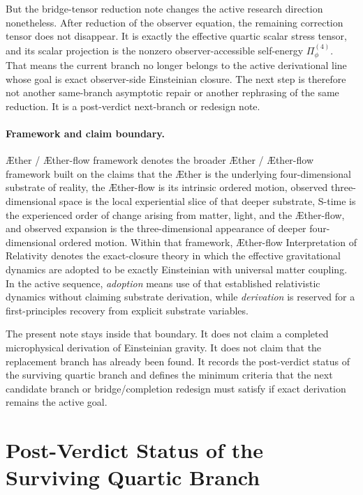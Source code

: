 \documentclass[11pt]{article}
\newcommand{\Aether}{\AE{}ther}
\newcommand{\Aflow}{\AE{}ther-flow}
\newcommand{\TheoryName}{\Aflow{} Interpretation of Relativity}
\newcommand{\TheoryProgram}{\Aether{} / \Aflow{} framework}
\begin{document}
But the bridge-tensor reduction note changes the active research direction nonetheless. After reduction of the observer equation, the remaining correction tensor does not disappear. It is exactly the effective quartic scalar stress tensor, and its scalar projection is the nonzero observer-accessible self-energy \(\Pi_\phi^{(4)}\). That means the current branch no longer belongs to the active derivational line whose goal is exact observer-side Einsteinian closure. The next step is therefore not another same-branch asymptotic repair or another rephrasing of the same reduction. It is a post-verdict next-branch or redesign note.

\paragraph{Framework and claim boundary.}
\TheoryProgram{} denotes the broader \Aether{} / \Aflow{} framework built on the claims that the \Aether{} is the underlying four-dimensional substrate of reality, the \Aflow{} is its intrinsic ordered motion, observed three-dimensional space is the local experiential slice of that deeper substrate, S-time is the experienced order of change arising from matter, light, and the \Aflow{}, and observed expansion is the three-dimensional appearance of deeper four-dimensional ordered motion. Within that framework, \TheoryName{} denotes the exact-closure theory in which the effective gravitational dynamics are adopted to be exactly Einsteinian with universal matter coupling. In the active sequence, \emph{adoption} means use of that established relativistic dynamics without claiming substrate derivation, while \emph{derivation} is reserved for a first-principles recovery from explicit substrate variables.

The present note stays inside that boundary. It does not claim a completed microphysical derivation of Einsteinian gravity. It does not claim that the replacement branch has already been found. It records the post-verdict status of the surviving quartic branch and defines the minimum criteria that the next candidate branch or bridge/completion redesign must satisfy if exact derivation remains the active goal.

\section{Post-Verdict Status of the Surviving Quartic Branch}
\end{document}
